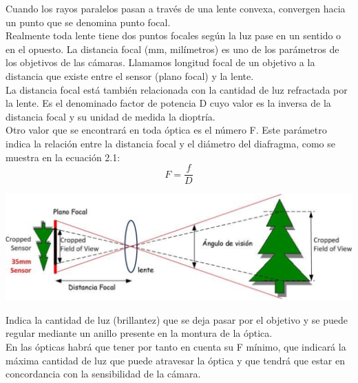 Cuando los rayos paralelos pasan a través de una lente convexa, convergen
hacia un punto que se denomina punto focal.\\
Realmente toda lente tiene dos puntos focales según la luz pase en un sentido o
en el opuesto. La distancia focal (mm, milímetros) es uno de los parámetros de los
objetivos de las cámaras. Llamamos longitud focal de un objetivo a la distancia que
existe entre el sensor (plano focal) y la lente.\\
La distancia focal está también relacionada con la cantidad de luz
refractada por la lente. Es el denominado factor de potencia D cuyo valor es la inversa
de la distancia focal y su unidad de medida la dioptría.\\
Otro valor que se encontrará en toda óptica es el número F. Este parámetro
indica la relación entre la distancia focal y el diámetro del diafragma, como se muestra en la ecuación 2.1:
\begin{equation}
	F = \frac{f}{D}
\end{equation}
\begin{center}
	\includegraphics[width=1.0 \textwidth]{Contenido/Cuerpo/Capitulo2/Fig1_4.eps}
	\label{fig:MarcoTeorico:Fig6}
\end{center}
Indica la cantidad de luz (brillantez) que se deja pasar por el objetivo y se puede regular
mediante un anillo presente en la montura de la óptica.\\
En las ópticas habrá que tener por
tanto en cuenta su F mínimo, que indicará la máxima cantidad de luz que puede
atravesar la óptica y que tendrá que estar en concordancia con la sensibilidad de la
cámara.

